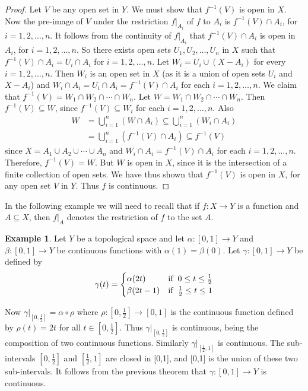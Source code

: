 \documentclass[11pt,a4paper]{article}
\theoremstyle{definition}
\newtheorem{exa}[thm]{Example}
\begin{document}
\begin{proof}
Let $V$ be any open set in $Y$. We must show that $f^{-1}(V)$ is open in $X$. Now the pre-image of $V$ under the restriction $f|_{A_i}$ of $f$ to $A_i$ is $f^{-1}(V)\cap A_i$, for $i=1,2,\ldots,n$. It follows from the continuity of $f|_{A_i}$ that $f^{-1}(V)\cap A_i$ is open in $A_i$, for $i=1,2,\ldots,n$. So there exists open sets $U_1,U_2,\ldots,U_n$ in $X$ such that $f^{-1}(V)\cap A_i=U_i\cap A_i$ for $i=1,2,\ldots,n$.  Let $W_i=U_i\cup (X-A_i)$ for every $i=1,2,\ldots,n$. Then $W_i$ is an open set in $X$ (as it is a union of open sets $U_i$ and $X-A_i$) and $W_i\cap A_i=U_i\cap A_i=f^{-1}(V)\cap A_i$ for each $i=1,2,\ldots,n$. We claim that $f^{-1}(V)=W_1\cap W_2\cap\cdots\cap W_n$. Let $W=W_1\cap W_2\cap\cdots\cap W_n$. Then $f^{-1}(V)\subseteq W$, since $f^{-1}(V)\subseteq W_i$ for each $i=1,2,\ldots,n$. Also
\begin{align*}
W &=\bigcup^n_{i=1}(W\cap A_i)\subseteq \bigcup^n_{i=1}(W_i\cap A_i)\\
  &=\bigcup^n_{i=1}(f^{-1}(V)\cap A_i)\subseteq f^{-1}(V)
\end{align*} 
since $X=A_1\cup A_2\cup\cdots\cup A_n$ and $W_i\cap A_i=f^{-1}(V)\cap A_i$ for each $i=1,2,\ldots,n$. Therefore, $f^{-1}(V)=W$. But $W$ is open in $X$, since it is the intersection of a finite collection of open sets. We have thus shown that $f^{-1}(V)$ is open in $X$, for any open set $V$ in $Y$. Thus $f$ is continuous.
\end{proof}

In the following example we will need to recall that if $f:X\rightarrow Y$ is a function and $A\subseteq X$, then $f|_A$ denotes the restriction of $f$ to the set $A$.






\begin{exa}
Let $Y$ be a topological space and let $\alpha:[0,1]\rightarrow Y$ and $\beta:[0,1]\rightarrow Y$ be continuous functions with $\alpha (1)=\beta (0)$. Let $\gamma :[0,1]\rightarrow Y$ be defined by
\[ \gamma(t)=
\begin{cases}
\alpha(2t) & \text{if}\hspace{0.2cm} 0\leq t\leq \frac{1}{2}\\
\beta(2t-1) & \text{if}\hspace{0.2cm} \frac{1}{2}\leq t\leq 1
\end{cases}
\]


Now $\gamma\big|_{[0,\frac{1}{2}]}=\alpha\circ\rho$ where $\rho:[0,\frac{1}{2}]\rightarrow [0,1]$ is the continuous function defined by $\rho(t)=2t$ for all $t\in [0,\frac{1}{2}]$. Thus $\gamma\big|_{[0,\frac{1}{2}]}$ is continuous, being the composition of two continuous functions. Similarly $\gamma\big|_{[\frac{1}{2},1]}$ is continuous. The sub-intervals $[0,\frac{1}{2}]$ and $[\frac{1}{2},1]$ are closed in [0,1], and [0,1] is the union of these two sub-intervals. It follows from the previous theorem that $\gamma :[0,1]\rightarrow Y$ is continuous.
\end{exa}
\end{document}
